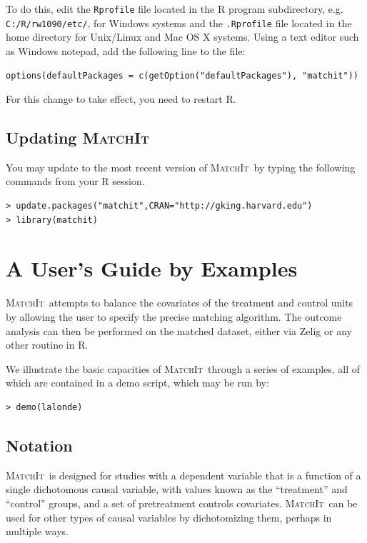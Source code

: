 \documentclass[oneside,letterpaper,titlepage]{article}
\newcommand{\MatchIt}{\textsc{MatchIt}}
\begin{document}
To do this, edit the {\tt Rprofile} file located in the R program
subdirectory, e.g. \texttt{C:/R/rw1090/etc/}, for Windows systems and
the {\tt .Rprofile} file located in the home directory for Unix/Linux
and Mac OS X systems.  Using a text editor such as Windows notepad,
add the following line to the file:
\begin{verbatim}
options(defaultPackages = c(getOption("defaultPackages"), "matchit"))
\end{verbatim}
For this change to take effect, you need to restart R.

\subsection{Updating \MatchIt}
You may update to the most recent version of \MatchIt\ by typing the
following commands from your R session.

\begin{small}
\begin{verbatim}
> update.packages("matchit",CRAN="http://gking.harvard.edu")
> library(matchit) 
\end{verbatim}
\end{small} 

\section{A User's Guide by Examples}
\MatchIt\ attempts to balance the covariates of the treatment and
control units by allowing the user to specify the precise matching
algorithm.  The outcome analysis can then be performed on the matched
dataset, either via Zelig or any other routine in R.

We illustrate the basic capacities of \MatchIt\ through a series of
examples, all of which are contained in a demo script, which may be
run by: 

\begin{verbatim}
> demo(lalonde)
\end{verbatim}

\subsection{Notation}
\MatchIt\ is designed for studies with a dependent variable that is a
function of a single dichotomous causal variable, with values known as
the ``treatment'' and ``control'' groups, and a set of pretreatment
controls covariates.  \MatchIt\ can be used for other types of causal
variables by dichotomizing them, perhaps in multiple ways.
\end{document}

